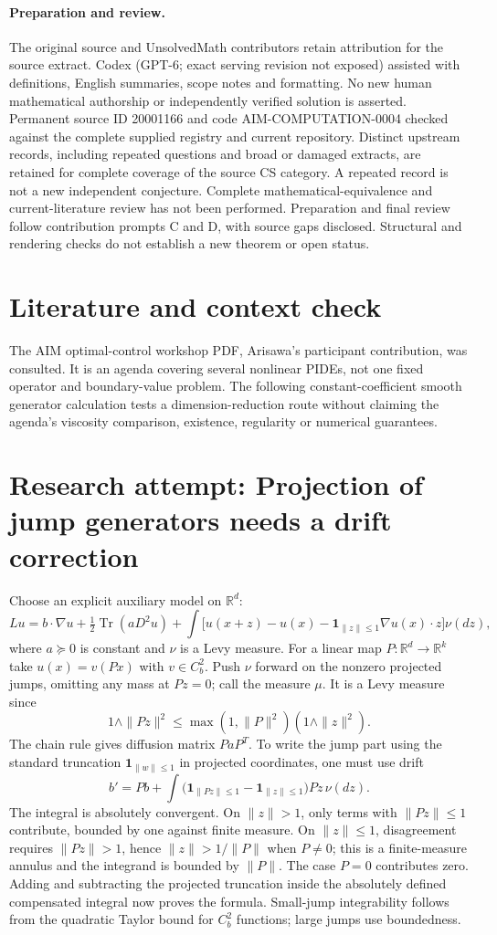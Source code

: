 \documentclass[11pt]{article}
\begin{document}
\paragraph{Preparation and review.}
The original source and UnsolvedMath contributors retain attribution for the source extract. Codex (GPT-6; exact serving revision not exposed) assisted with definitions, English summaries, scope notes and formatting. No new human mathematical authorship or independently verified solution is asserted. Permanent source ID 20001166 and code AIM-COMPUTATION-0004 checked against the complete supplied registry and current repository. Distinct upstream records, including repeated questions and broad or damaged extracts, are retained for complete coverage of the source CS category. A repeated record is not a new independent conjecture. Complete mathematical-equivalence and current-literature review has not been performed. Preparation and final review follow contribution prompts C and D, with source gaps disclosed. Structural and rendering checks do not establish a new theorem or open status.
\label{end:20001166}

\section{Literature and context check}
The AIM optimal-control workshop PDF, Arisawa's participant contribution,
was consulted. It is an agenda covering several nonlinear PIDEs, not one fixed
operator and boundary-value problem. The following constant-coefficient smooth
generator calculation tests a dimension-reduction route without claiming the
agenda's viscosity comparison, existence, regularity or numerical guarantees.
\section{Research attempt: Projection of jump generators needs a drift correction}
Choose an explicit auxiliary model on $\mathbb R^d$:
\[
 Lu=b\cdot\nabla u+\tfrac12\operatorname{Tr}(aD^2u)
 +\int\big[u(x+z)-u(x)-\mathbf1_{\|z\|\le1}\nabla u(x)\cdot z\big]\nu(dz),
\]
where $a\succeq0$ is constant and $\nu$ is a Levy measure. For a linear map
$P:\mathbb R^d\to\mathbb R^k$ take $u(x)=v(Px)$ with $v\in C_b^2$.
Push $\nu$ forward on the nonzero projected jumps, omitting any mass at $Pz=0$;
call the measure $\mu$. It is a Levy measure since
\[
 1\wedge\|Pz\|^2\le\max(1,\|P\|^2)(1\wedge\|z\|^2).
\]
The chain rule gives diffusion matrix $PaP^T$. To write the jump part using
the standard truncation $\mathbf1_{\|w\|\le1}$ in projected coordinates, one
must use drift
\[
 b'=Pb+\int\big(\mathbf1_{\|Pz\|\le1}-\mathbf1_{\|z\|\le1}\big)Pz\,\nu(dz).
\]
The integral is absolutely convergent. On $\|z\|>1$, only terms with
$\|Pz\|\le1$ contribute, bounded by one against finite measure. On
$\|z\|\le1$, disagreement requires $\|Pz\|>1$, hence
$\|z\|>1/\|P\|$ when $P\ne0$; this is a finite-measure annulus and the
integrand is bounded by $\|P\|$. The case $P=0$ contributes zero. Adding and
subtracting the projected truncation inside the absolutely defined compensated
integral now proves the formula. Small-jump integrability follows from the
quadratic Taylor bound for $C_b^2$ functions; large jumps use boundedness.
\end{document}
